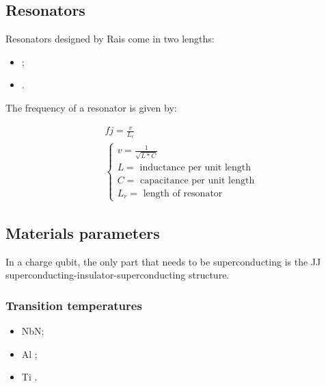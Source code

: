 \subsection{Resonators}
\label{sec:resonators}

\noindent Resonators designed by Rais come in two lengths:
\begin{itemize}
\item {};
\item {}.
\end{itemize}

\noindent The frequency of a resonator is given by:

\begin{equation}
  \label{eq:fabrication_groupSpeed}
  \begin{aligned}
    & f j= \frac{v}{L_{r}}\\
    & \begin{cases}
      v = \frac{1}{\sqrt{L*C}}\\
      L = \text{ inductance per unit length}\\
      C = \text{ capacitance per unit length}\\
      L_{r} = \text{ length of resonator}
    \end{cases}
  \end{aligned}
\end{equation}

\noindent

\newpage\subsection{Materials parameters}
\label{sec:materials-parameters}

\begin{framed}\noindent
  In a charge qubit, the only  part that needs to be superconducting is
  the    JJ     superconducting-insulator-superconducting    structure.
\end{framed}

\subsubsection{Transition temperatures}
\label{sec:trans-temp}
\begin{itemize}
\item NbN\hfill {};
\item Al \hfill {};
\item Ti \hfill {}.
\end{itemize}

